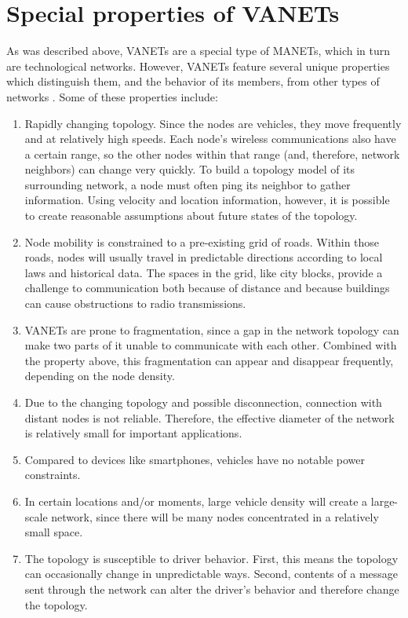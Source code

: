 \chapter{Special properties of VANETs}
\label{chap:socialvanets}


As was described above, VANETs are a special type of MANETs, which in turn are technological networks.
However, VANETs feature several unique properties which distinguish them, and the behavior of its members, from other types of networks \cite{yousefi2006vehicular}.
Some of these properties include:

\begin{enumerate}

	\item 	Rapidly changing topology.
			Since the nodes are vehicles, they move frequently and at relatively high speeds.
			Each node's wireless communications also have a certain range, so the other nodes within that range (and, therefore, network neighbors) can change very quickly.
			To build a topology model of its surrounding network, a node must often ping its neighbor to gather information.
			Using velocity and location information, however, it is possible to create reasonable assumptions about future states of the topology.
			
	\item	Node mobility is constrained to a pre-existing grid of roads.
			Within those roads, nodes will usually travel in predictable directions according to local laws and historical data.
			The spaces in the grid, like city blocks, provide a challenge to communication both because of distance and because buildings can cause obstructions to radio transmissions.
			
	\item	VANETs are prone to fragmentation, since a gap in the network topology can make two parts of it unable to communicate with each other.
			Combined with the property above, this fragmentation can appear and disappear frequently, depending on the node density.
			
	\item	Due to the changing topology and possible disconnection, connection with distant nodes is not reliable.
			Therefore, the effective diameter of the network is relatively small for important applications.
			
	\item 	Compared to devices like smartphones, vehicles have no notable power constraints.

	\item 	In certain locations and/or moments, large vehicle density will create a large-scale network, since there will be many nodes concentrated in a relatively small space.
	
	\item 	The topology is susceptible to driver behavior.
			First, this means the topology can occasionally change in unpredictable ways.
			Second, contents of a message sent through the network can alter the driver's behavior and therefore change the topology.
			
\end{enumerate}

